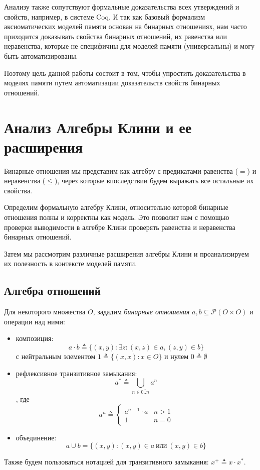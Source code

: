\documentclass[times
              ]{itmo-student-thesis}
\begin{document}
  Анализу также сопутствуют формальные доказательства всех утверждений и свойств, например, в системе Coq.
  И так как базовый формализм аксиоматических моделей памяти основан на бинарных отношениях, нам часто
  приходится доказывать свойства бинарных отношений, их равенства или неравенства, которые не
  специфичны для моделей памяти (универсальны) и могу быть автоматизированы.

  Поэтому цель данной работы состоит в том, чтобы упростить доказательства в моделях памяти путем
  автоматизации доказательств свойств бинарных отношений.

  \section{Анализ Алгебры Клини и ее расширения}

    Бинарные отношения мы представим как алгебру с предикатами равенства ($ = $) и неравенства ($ \leq $),
    через которые впоследствии будем выражать все остальные их свойства.

    Определим формальную алгебру Клини, относительно которой бинарные отношения полны и корректны как модель.
    Это позволит нам с помощью проверки выводимости в алгебре Клини проверять равенства и неравенства бинарных отношений.

    Затем мы рассмотрим различные расширения алгебры Клини и проанализируем их полезность в контексте моделей памяти.

    \subsection{Алгебра отношений}
      Для некоторого множества $ O $, зададим \textit{бинарные отношения}
      $ a, b \subseteq \mathcal{P}(O \times O) $
      и операции над ними:
      \begin{itemize}
        \item композиция:
         $$a \cdot b \triangleq \{ (x, y) : \exists z : (x, z) \in a, (z, y) \in b \} $$
        с нейтральным элементом $ 1 \triangleq \{(x, x) : x \in O\} $
        и нулем $ 0 \triangleq \emptyset $
        \item рефлексивное транзитивное замыкания:
        $$ a^* \triangleq \bigcup\limits_{n \in \overline{0..n}} a^n $$,
       где
       \begin{equation*}
        a^n \triangleq \begin{cases}
          a^{n-1} \cdot a & n > 1\\
          1          & n = 0
        \end{cases}
       \end{equation*}
       \item объединение:
       $$ a \cup b = \{(x, y) : (x, y) \in a ~\text{или}~ (x, y) \in b   \} $$
      \end{itemize}
      Также будем пользоваться нотацией для транзитивного замыкания: $ x^+ \triangleq x \cdot x^*$.
\end{document}
